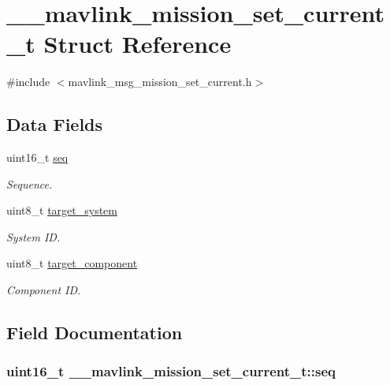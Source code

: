 \hypertarget{struct____mavlink__mission__set__current__t}{\section{\+\_\+\+\_\+mavlink\+\_\+mission\+\_\+set\+\_\+current\+\_\+t Struct Reference}
\label{struct____mavlink__mission__set__current__t}
}


{\ttfamily \#include $<$mavlink\+\_\+msg\+\_\+mission\+\_\+set\+\_\+current.\+h$>$}

\subsection*{Data Fields}
\begin{DoxyCompactItemize}
\item 
uint16\+\_\+t \hyperlink{struct____mavlink__mission__set__current__t_add7d7aa3830c71875706ac4e8e5206aa}{seq}
\begin{DoxyCompactList}\small\item\em Sequence. \end{DoxyCompactList}\item 
uint8\+\_\+t \hyperlink{struct____mavlink__mission__set__current__t_aa9499477334421047ddb7b3d8e4b7794}{target\+\_\+system}
\begin{DoxyCompactList}\small\item\em System I\+D. \end{DoxyCompactList}\item 
uint8\+\_\+t \hyperlink{struct____mavlink__mission__set__current__t_a367ad0a39fa1fc6d06ee1aa06a9a6908}{target\+\_\+component}
\begin{DoxyCompactList}\small\item\em Component I\+D. \end{DoxyCompactList}\end{DoxyCompactItemize}


\subsection{Field Documentation}
\hypertarget{struct____mavlink__mission__set__current__t_add7d7aa3830c71875706ac4e8e5206aa}{
\subsubsection[{seq}]{\setlength{\rightskip}{0pt plus 5cm}uint16\+\_\+t \+\_\+\+\_\+mavlink\+\_\+mission\+\_\+set\+\_\+current\+\_\+t\+::seq}}\label{struct____mavlink__mission__set__current__t_add7d7aa3830c71875706ac4e8e5206aa}



